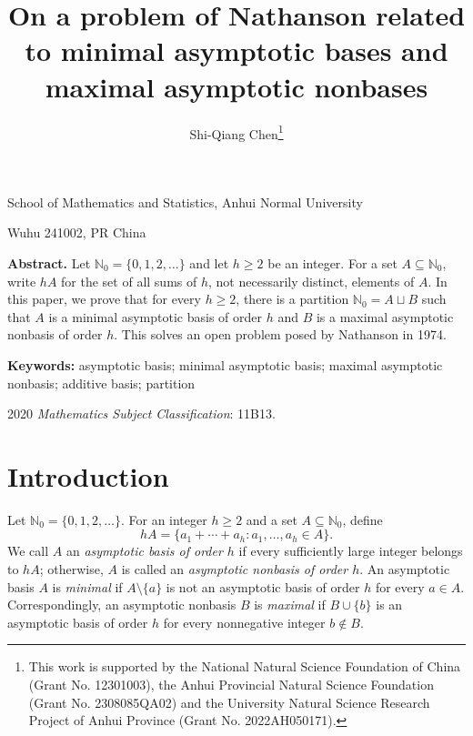 \documentclass[reqno,12pt,twoside]{article}
\numberwithin{equation}{section}
\newcommand{\Nzero}{\mathbb N_0}
\begin{document}
\title{\Large On a problem of Nathanson related to minimal asymptotic bases and maximal asymptotic nonbases
}\author{\large Shi-Qiang Chen\thanks{This work is supported by the National Natural Science Foundation of China (Grant No.
12301003), the Anhui Provincial Natural Science Foundation (Grant No. 2308085QA02) and
the University Natural Science Research Project of Anhui Province (Grant No. 2022AH050171).}}
\date{} \maketitle
 \vskip -3cm
\begin{center}
\vskip -1cm { \small
\begin{center}
 School of Mathematics and Statistics, Anhui Normal
University
\end{center}
\begin{center}
Wuhu 241002, PR China
\end{center}}
\end{center}

{\bf Abstract.} Let $\Nzero=\{0,1,2,\ldots\}$ and let $h\ge2$ be an integer. For a set $A\subseteq\Nzero$, write $hA$ for the set of all sums of $h$, not necessarily distinct, elements of $A$. In this paper, we prove that for every $h\ge2$, there is a partition $\Nzero=A\sqcup B$ such that $A$ is a minimal asymptotic basis of order $h$ and $B$ is a maximal asymptotic nonbasis of order $h$. This solves an open problem posed by Nathanson in 1974.

{\bf Keywords:} asymptotic basis; minimal asymptotic basis; maximal asymptotic nonbasis; additive basis; partition

2020 {\it Mathematics Subject Classification}: 11B13.

\section{Introduction}

Let $\Nzero=\{0,1,2,\ldots\}$. For an integer $h\ge2$ and a set $A\subseteq\Nzero$, define
\[
 hA=\{a_1+\cdots+a_h:a_1,\ldots,a_h\in A\}.
\]
We call $A$ an \emph{asymptotic basis of order $h$} if every sufficiently large integer belongs to $hA$; otherwise, $A$ is called an \emph{asymptotic nonbasis of order $h$}. An asymptotic basis $A$ is \emph{minimal} if $A\setminus\{a\}$ is not an asymptotic basis of order $h$ for every $a\in A$. Correspondingly, an asymptotic nonbasis $B$ is \emph{maximal} if $B\cup\{b\}$ is an asymptotic basis of order $h$ for every nonnegative integer $b\notin B$.
\end{document}
